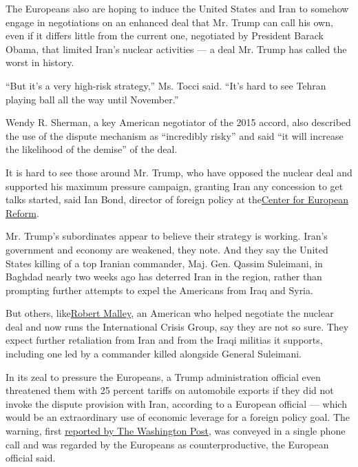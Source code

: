 The Europeans also are hoping to induce the United States and Iran to
somehow engage in negotiations on an enhanced deal that Mr. Trump can
call his own, even if it differs little from the current one, negotiated
by President Barack Obama, that limited Iran's nuclear activities --- a
deal Mr. Trump has called the worst in history.

``But it's a very high-risk strategy,'' Ms. Tocci said. ``It's hard to
see Tehran playing ball all the way until November.''

Wendy R. Sherman, a key American negotiator of the 2015 accord, also
described the use of the dispute mechanism as ``incredibly risky'' and
said ``it will increase the likelihood of the demise'' of the deal.

It is hard to see those around Mr. Trump, who have opposed the nuclear
deal and supported his maximum pressure campaign, granting Iran any
concession to get talks started, said Ian Bond, director of foreign
policy at the\href{https://www.cer.eu/}{Center for European Reform}.

Mr. Trump's subordinates appear to believe their strategy is working.
Iran's government and economy are weakened, they note. And they say the
United States killing of a top Iranian commander, Maj. Gen. Qassim
Suleimani, in Baghdad nearly two weeks ago has deterred Iran in the
region, rather than prompting further attempts to expel the Americans
from Iraq and Syria.

But others,
like\href{https://www.crisisgroup.org/who-we-are/people/robert-malley-0}{Robert
Malley}, an American who helped negotiate the nuclear deal and now runs
the International Crisis Group, say they are not so sure. They expect
further retaliation from Iran and from the Iraqi militias it supports,
including one led by a commander killed alongside General Suleimani.

In its zeal to pressure the Europeans, a Trump administration official
even threatened them with 25 percent tariffs on automobile exports if
they did not invoke the dispute provision with Iran, according to a
European official --- which would be an extraordinary use of economic
leverage for a foreign policy goal. The warning, first
\href{https://www.washingtonpost.com/world/national-security/days-before-europeans-warned-iran-of-nuclear-deal-violations-trump-secretly-threatened-to-impose-25percent-tariff-on-european-autos-if-they-didnt/2020/01/15/0a3ea8ce-37a9-11ea-a01d-b7cc8ec1a85d_story.html}{reported
by The Washington Post}, was conveyed in a single phone call and was
regarded by the Europeans as counterproductive, the European official
said.

